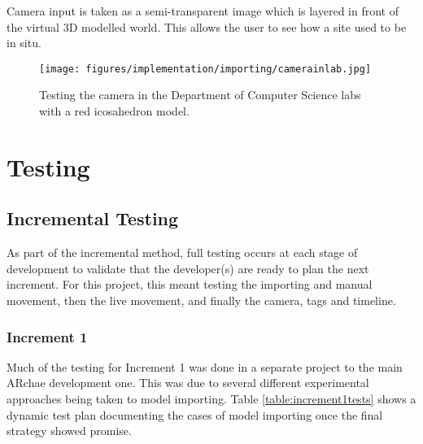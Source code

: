 \documentclass[12pt, a4paper]{article}
\begin{document}
Camera input is taken as a semi-transparent image which is layered in front of the virtual 3D modelled world. This allows the user to see how a site used to be in situ.

\begin{figure}[H]
    \centering
    \texttt{[image: figures/implementation/importing/camerainlab.jpg]}
        \caption{Testing the camera in the Department of Computer Science labs with a red icosahedron model.}
        \label{fig:camerainlab}
\end{figure}

\newpage
\section{Testing}

\subsection{Incremental Testing}
As part of the incremental method, full testing occurs at each stage of development to validate that the developer(s) are ready to plan the next increment. For this project, this meant testing the importing and manual movement, then the live movement, and finally the camera, tags and timeline. 

\subsubsection{Increment 1}
Much of the testing for Increment 1 was done in a separate project to the main ARchae development one. This was due to several different experimental approaches being taken to model importing. Table \ref{table:increment1tests} shows a dynamic test plan documenting the cases of model importing once the final strategy showed promise. 
\end{document}
